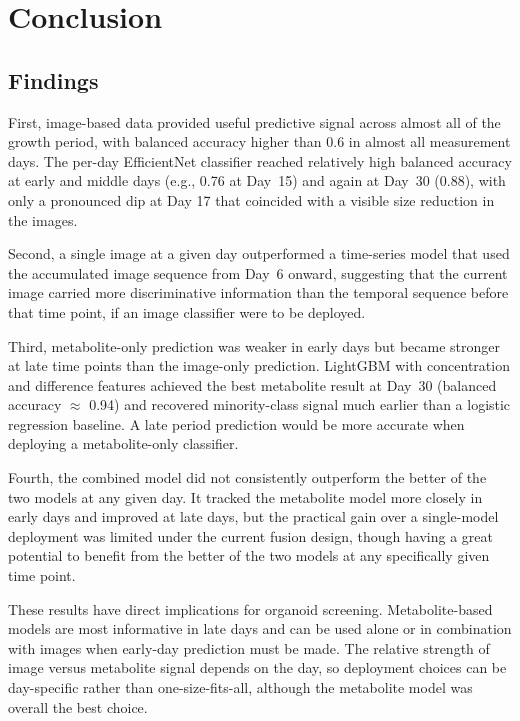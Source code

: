 \documentclass{article}
\begin{document}
\section{Conclusion}

\subsection{Findings}

First, image-based data provided useful predictive signal across almost all of the growth period, with balanced accuracy higher than 0.6 in almost all measurement days. The per-day EfficientNet classifier reached relatively high balanced accuracy at early and middle days (e.g., 0.76 at Day~15) and again at Day~30 (0.88), with only a pronounced dip at Day 17 that coincided with a visible size reduction in the images. 

Second, a single image at a given day outperformed a time-series model that used the accumulated image sequence from Day~6 onward, suggesting that the current image carried more discriminative information than the temporal sequence before that time point, if an image classifier were to be deployed. 

Third, metabolite-only prediction was weaker in early days but became stronger at late time points than the image-only prediction. LightGBM with concentration and difference features achieved the best metabolite result at Day~30 (balanced accuracy $\approx$ 0.94) and recovered minority-class signal much earlier than a logistic regression baseline. A late period prediction would be more accurate when deploying a metabolite-only classifier. 

Fourth, the combined model did not consistently outperform the better of the two models at any given day. It tracked the metabolite model more closely in early days and improved at late days, but the practical gain over a single-model deployment was limited under the current fusion design, though having a great potential to benefit from the better of the two models at any specifically given time point.

These results have direct implications for organoid screening. Metabolite-based models are most informative in late days and can be used alone or in combination with images when early-day prediction must be made. The relative strength of image versus metabolite signal depends on the day, so deployment choices can be day-specific rather than one-size-fits-all, although the metabolite model was overall the best choice. 
\end{document}
